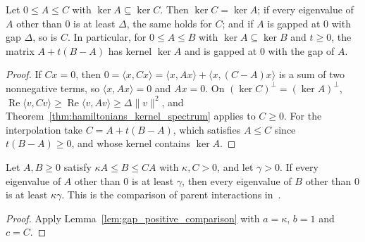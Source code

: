 \begin{theorem}
    \label{thm:hamiltonians_kernel_gap_domination}
    \leanok
    Let $0\le A\le C$ with $\ker A\subseteq\ker C$. Then $\ker C=\ker A$; if every
    eigenvalue of $A$ other than $0$ is at least $\Delta$, the same holds for $C$;
    and if $A$ is gapped at $0$ with gap $\Delta$, so is $C$. In particular, for
    $0\le A\le B$ with $\ker A\subseteq\ker B$ and $t\ge0$, the matrix
    $A+t(B-A)$ has kernel $\ker A$ and is gapped at $0$ with the gap of $A$.
\end{theorem}
\begin{proof}\leanok
    If $Cx=0$, then
    $0=\langle x,Cx\rangle=\langle x,Ax\rangle+\langle x,(C-A)x\rangle$ is a sum of
    two nonnegative terms, so $\langle x,Ax\rangle=0$ and $Ax=0$. On
    $(\ker C)^\perp=(\ker A)^\perp$,
    $\operatorname{Re}\langle v,Cv\rangle\ge\operatorname{Re}\langle v,Av\rangle\ge
        \Delta\lVert v\rVert^2$, and Theorem~\ref{thm:hamiltonians_kernel_spectrum}
    applies to $C\ge0$. For the interpolation take $C=A+t(B-A)$, which satisfies
    $A\le C$ since $t(B-A)\ge0$, and whose kernel contains $\ker A$.
\end{proof}

\begin{theorem}
    \label{thm:hamiltonians_kernel_gap_comparison}
    \leanok
    Let $A,B\ge0$ satisfy $\kappa A\le B\le CA$ with $\kappa,C>0$, and let $\gamma>0$.
    If every eigenvalue of $A$ other than $0$ is at least $\gamma$, then every eigenvalue
    of $B$ other than $0$ is at least $\kappa\gamma$. This is the comparison of parent
    interactions in~\cite[Section~IV.C]{Cirac2021Matrix}.
\end{theorem}
\begin{proof}\leanok
    Apply Lemma~\ref{lem:gap_positive_comparison} with $a=\kappa$, $b=1$ and $c=C$.
\end{proof}

